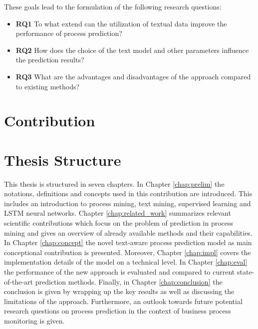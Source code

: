 These goals lead to the formulation of the following research questions:

\begin{itemize}
	\item[] \textbf{RQ1} To what extend can the utilization of textual data improve the performance of process prediction?
	\item[] \textbf{RQ2} How does the choice of the text model and other parameters influence the prediction results?
	\item[] \textbf{RQ3} What are the advantages and disadvantages of the approach compared to existing methods?
\end{itemize}

\section{Contribution}



\section{Thesis Structure}

This thesis is structured in seven chapters.
In Chapter \ref{chap:prelim} the notations, definitions and concepts used in this contribution are introduced.
This includes an introduction to process mining, text mining, supervised learning and LSTM neural networks.
Chapter \ref{chap:related_work} summarizes relevant scientific contributions which focus on the problem of prediction in process mining and gives an overview of already available methods and their capabilities.
In Chapter \ref{chap:concept} the novel text-aware process prediction model as main conceptional contribution is presented.
Moreover, Chapter \ref{chap:impl} covers the implementation details of the model on a technical level.
In Chapter \ref{chap:eval} the performance of the new approach is evaluated and compared to current state-of-the-art prediction methods.
Finally, in Chapter \ref{chap:conclusion} the conclusion is given by wrapping up the key results as well as discussing the limitations of the approach.
Furthermore, an outlook towards future potential research questions on process prediction in the context of business process monitoring is given.